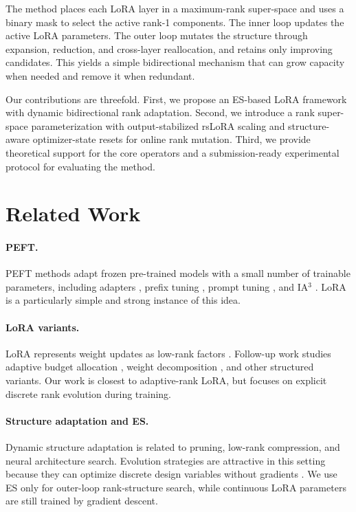 \documentclass{article}
\begin{document}
The method places each LoRA layer in a maximum-rank super-space and uses a binary mask to select the active rank-1 components. The inner loop updates the active LoRA parameters. The outer loop mutates the structure through expansion, reduction, and cross-layer reallocation, and retains only improving candidates. This yields a simple bidirectional mechanism that can grow capacity when needed and remove it when redundant.

Our contributions are threefold. First, we propose an ES-based LoRA framework with dynamic bidirectional rank adaptation. Second, we introduce a rank super-space parameterization with output-stabilized rsLoRA scaling and structure-aware optimizer-state resets for online rank mutation. Third, we provide theoretical support for the core operators and a submission-ready experimental protocol for evaluating the method.


\section{Related Work}
\label{sec:related}

\paragraph{PEFT.}
PEFT methods adapt frozen pre-trained models with a small number of trainable parameters, including adapters \citep{houlsby2019adapter}, prefix tuning \citep{li2021prefix}, prompt tuning \citep{lester2021power}, and IA$^3$ \citep{liu2022fewshot}. LoRA is a particularly simple and strong instance of this idea.

\paragraph{LoRA variants.}
LoRA represents weight updates as low-rank factors \citep{hu2022lora}. Follow-up work studies adaptive budget allocation \citep{zhang2023adalora}, weight decomposition \citep{liu2024dora}, and other structured variants. Our work is closest to adaptive-rank LoRA, but focuses on explicit discrete rank evolution during training.

\paragraph{Structure adaptation and ES.}
Dynamic structure adaptation is related to pruning, low-rank compression, and neural architecture search. Evolution strategies are attractive in this setting because they can optimize discrete design variables without gradients \citep{rechenberg1973evolutionsstrategie,schwefel1977numerische,salimans2017es,real2019regularized}. We use ES only for outer-loop rank-structure search, while continuous LoRA parameters are still trained by gradient descent.
\end{document}

